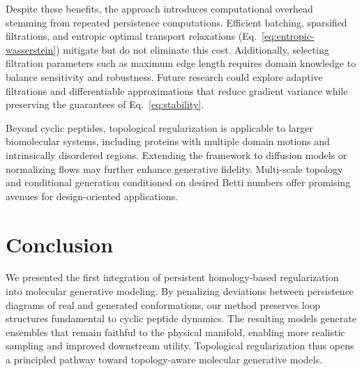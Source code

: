 \documentclass[11pt]{article}
\begin{document}
Despite these benefits, the approach introduces computational overhead stemming from repeated persistence computations. Efficient batching, sparsified filtrations, and entropic optimal transport relaxations (Eq.~\eqref{eq:entropic-wasserstein}) mitigate but do not eliminate this cost. Additionally, selecting filtration parameters such as maximum edge length requires domain knowledge to balance sensitivity and robustness. Future research could explore adaptive filtrations and differentiable approximations that reduce gradient variance while preserving the guarantees of Eq.~\eqref{eq:stability}.

Beyond cyclic peptides, topological regularization is applicable to larger biomolecular systems, including proteins with multiple domain motions and intrinsically disordered regions. Extending the framework to diffusion models or normalizing flows may further enhance generative fidelity. Multi-scale topology and conditional generation conditioned on desired Betti numbers offer promising avenues for design-oriented applications.

\section{Conclusion}
We presented the first integration of persistent homology-based regularization into molecular generative modeling. By penalizing deviations between persistence diagrams of real and generated conformations, our method preserves loop structures fundamental to cyclic peptide dynamics. The resulting models generate ensembles that remain faithful to the physical manifold, enabling more realistic sampling and improved downstream utility. Topological regularization thus opens a principled pathway toward topology-aware molecular generative models.
\end{document}
